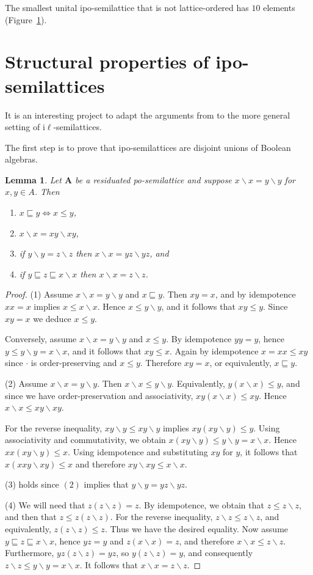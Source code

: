 \documentclass[12pt]{amsart}
\newtheorem{lemma}[theorem]{Lemma}
\newcommand{\m}{\mathbf} %
\newcommand{\ld}{{\backslash}}
\begin{document}
The smallest unital ipo-semilattice that is not lattice-ordered has $10$ elements (Figure~\ref{}).



\section{Structural properties of ipo-semilattices}
It is an interesting project to adapt the arguments from \cite{JTV2020} to
the more general setting of i$\ell$-semilattices.

The first step is to prove that ipo-semilattices are disjoint unions of Boolean algebras.


\begin{lemma}\label{xxyy} Let $\m A$ be a residuated po-semilattice and suppose $x\ld x=y\ld y$ for $x,y\in A$. Then
\begin{enumerate}
\item $x\sqsubseteq y\iff x\le y$,
\item $x\ld x=xy\ld xy$,
\item if $y\ld y=z\ld z$ then $x\ld x=yz\ld yz$, and
\item if $y\sqsubseteq z\sqsubseteq x\ld x$ then $x\ld x=z\ld z$.
\end{enumerate}
\end{lemma}
\begin{proof}
(1) Assume $x\ld x=y\ld y$ and $x\sqsubseteq y$. Then $xy=x$, and by idempotence $xx=x$ implies $x\le x\ld x$. Hence $x\le y\ld y$, and it follows that $xy\le y$. Since $xy=x$ we deduce $x\le y$.

Conversely, assume $x\ld x=y\ld y$ and $x\le y$. By idempotence $yy=y$, hence
$y\le y\ld y=x\ld x$, and it follows that $xy\le x$. Again by idempotence $x=xx\le xy$ since $\cdot$ is order-preserving and $x\le y$. Therefore $xy=x$, or equivalently, $x\sqsubseteq y$.

(2) %
Assume $x\ld x = y\ld y$. Then $x\ld x \le y\ld y$. Equivalently, $y(x\ld x) \le y$, and since we have order-preservation and associativity, $xy(x\ld x) \le xy$. Hence $x \ld x \le xy \ld xy$.

For the reverse inequality, $xy\ld y\le xy\ld y$ implies $xy(xy\ld y)\le y$. Using associativity and commutativity, we obtain $x(xy\ld y)\le y\ld y=x\ld x$. Hence $xx(xy\ld y)\le x$. Using idempotence and substituting $xy$ for $y$, it follows that $x(xxy\ld xy)\le x$ and therefore $xy\ld xy\le x\ld x$.

(3) holds since $(2)$ implies that $y\ld y=yz\ld yz$.

(4) We will need that $z(z\ld z) = z$. By idempotence, we obtain that $z \le z\ld z$, and then that $z \le z(z\ld z)$. For the reverse inequality, $z \ld z \le z \ld z$, and equivalently, $z(z\ld z) \le z$. Thus we have the desired equality. Now assume $y\sqsubseteq z\sqsubseteq x\ld x$, hence $yz = y$ and $z(x\ld x) = z$, and therefore $x\ld x \le z\ld z$. Furthermore, $yz(z\ld z) = yz$, so $y(z\ld z) = y$, and consequently $z\ld z \le y\ld y = x\ld x$. It follows that $x\ld x = z\ld z$.
\end{proof}
\end{document}
